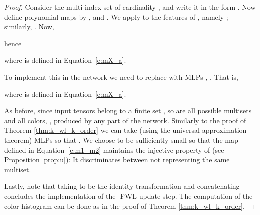 \documentclass{article}
\def\Eqref#1{Equation~\ref{#1}}
\begin{document}
\begin{proof}
Consider the multi-index set  of cardinality , and write it in the form . Now define polynomial maps  by , and . We apply  to the features of , namely ; similarly, . Now,

hence
 
where  is defined in \Eqref{e:mX_a}. 

To implement this in the network we need to replace  with MLPs , . That is, 

where  is defined in \Eqref{e:mX_a}.

As before, since input tensors belong to a finite set , so are all possible multisets  and all colors, , produced by any part of the network. Similarly to the proof of Theorem \ref{thm:k_wl_k_order} we can take (using the universal approximation theorem) MLPs  so that . We choose  to be sufficiently small so that the map  defined in \Eqref{e:m1_m2}  maintains the injective property of  (see Proposition \ref{prop:u}): It discriminates between  not representing the same multiset. 


Lastly, note that taking  to be the identity transformation and concatenating   concludes the implementation of the -FWL update step. The computation of the color histogram can be done as in the proof of Theorem \ref{thm:k_wl_k_order}.

\end{proof}
\end{document}
